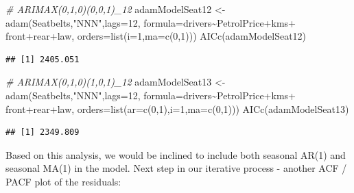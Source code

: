 \documentclass[
]{book}
\newenvironment{Shaded}{\begin{snugshade}}{\end{snugshade}}
\newcommand{\AttributeTok}[1]{\textcolor[rgb]{0.77,0.63,0.00}{#1}}
\newcommand{\CommentTok}[1]{\textcolor[rgb]{0.56,0.35,0.01}{\textit{#1}}}
\newcommand{\DecValTok}[1]{\textcolor[rgb]{0.00,0.00,0.81}{#1}}
\newcommand{\FunctionTok}[1]{\textcolor[rgb]{0.00,0.00,0.00}{#1}}
\newcommand{\NormalTok}[1]{#1}
\newcommand{\OtherTok}[1]{\textcolor[rgb]{0.56,0.35,0.01}{#1}}
\newcommand{\SpecialCharTok}[1]{\textcolor[rgb]{0.00,0.00,0.00}{#1}}
\newcommand{\StringTok}[1]{\textcolor[rgb]{0.31,0.60,0.02}{#1}}
\theoremstyle{definition}
\theoremstyle{definition}
\theoremstyle{definition}
\theoremstyle{definition}
\theoremstyle{remark}
\begin{document}
\begin{Shaded}
\begin{Highlighting}[]
\CommentTok{\# ARIMAX(0,1,0)(0,0,1)\_12}
\NormalTok{adamModelSeat12 }\OtherTok{\textless{}{-}} \FunctionTok{adam}\NormalTok{(Seatbelts,}\StringTok{"NNN"}\NormalTok{,}\AttributeTok{lags=}\DecValTok{12}\NormalTok{,}
                        \AttributeTok{formula=}\NormalTok{drivers}\SpecialCharTok{\textasciitilde{}}\NormalTok{PetrolPrice}\SpecialCharTok{+}\NormalTok{kms}\SpecialCharTok{+}
\NormalTok{                          front}\SpecialCharTok{+}\NormalTok{rear}\SpecialCharTok{+}\NormalTok{law,}
                        \AttributeTok{orders=}\FunctionTok{list}\NormalTok{(}\AttributeTok{i=}\DecValTok{1}\NormalTok{,}\AttributeTok{ma=}\FunctionTok{c}\NormalTok{(}\DecValTok{0}\NormalTok{,}\DecValTok{1}\NormalTok{)))}
\FunctionTok{AICc}\NormalTok{(adamModelSeat12)}
\end{Highlighting}
\end{Shaded}

\begin{verbatim}
## [1] 2405.051
\end{verbatim}

\begin{Shaded}
\begin{Highlighting}[]
\CommentTok{\# ARIMAX(0,1,0)(1,0,1)\_12}
\NormalTok{adamModelSeat13 }\OtherTok{\textless{}{-}} \FunctionTok{adam}\NormalTok{(Seatbelts,}\StringTok{"NNN"}\NormalTok{,}\AttributeTok{lags=}\DecValTok{12}\NormalTok{,}
                        \AttributeTok{formula=}\NormalTok{drivers}\SpecialCharTok{\textasciitilde{}}\NormalTok{PetrolPrice}\SpecialCharTok{+}\NormalTok{kms}\SpecialCharTok{+}
\NormalTok{                          front}\SpecialCharTok{+}\NormalTok{rear}\SpecialCharTok{+}\NormalTok{law,}
                        \AttributeTok{orders=}\FunctionTok{list}\NormalTok{(}\AttributeTok{ar=}\FunctionTok{c}\NormalTok{(}\DecValTok{0}\NormalTok{,}\DecValTok{1}\NormalTok{),}\AttributeTok{i=}\DecValTok{1}\NormalTok{,}\AttributeTok{ma=}\FunctionTok{c}\NormalTok{(}\DecValTok{0}\NormalTok{,}\DecValTok{1}\NormalTok{)))}
\FunctionTok{AICc}\NormalTok{(adamModelSeat13)}
\end{Highlighting}
\end{Shaded}

\begin{verbatim}
## [1] 2349.809
\end{verbatim}

Based on this analysis, we would be inclined to include both seasonal AR(1) and seasonal MA(1) in the model. Next step in our iterative process - another ACF / PACF plot of the residuals:
\end{document}
